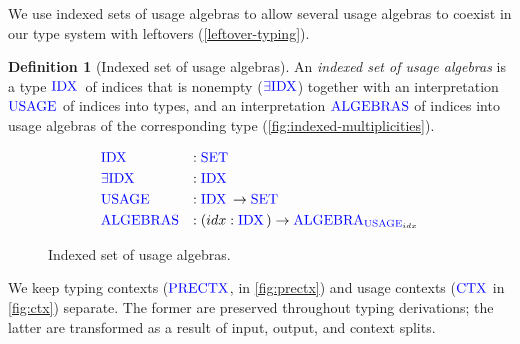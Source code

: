 \documentclass[sigplan,10pt,anonymous,review]{acmart}
\theoremstyle{definition}
\newtheorem{nidefinition}{Definition}
\newcommand{\type}[1]{\textcolor{blue}{\operatorname{#1}}}
\newcommand{\Set}{\type{SET}}
\newcommand{\PreCtx}{\type{PRECTX}}
\newcommand{\Ctx}{\type{CTX}}
\newcommand{\Idx}{\type{IDX}\,}
\newcommand{\Usage}{\type{USAGE}}
\newcommand{\Algebra}{\type{ALGEBRA}}
\begin{document}
We use indexed sets of usage algebras to allow several usage algebras to coexist in our type system with leftovers (\autoref{leftover-typing}).
\begin{nidefinition}[Indexed set of usage algebras]
  An \emph{indexed set of usage algebras} is a type $\Idx$ of indices that is nonempty ($\type{\exists IDX}$) together with an interpretation $\Usage$ of indices into types, and an interpretation $\type{ALGEBRAS}$ of indices into usage algebras of the corresponding type (\autoref{fig:indexed-multiplicities}).
  \begin{figure}[h]
    \begin{equation*}
      \begin{aligned}
        &\Idx               &:{} &\Set \\
        &\type{\exists IDX} &:{} &\Idx \\
        &\Usage             &:{} &\Idx \to \Set \\
        &\type{ALGEBRAS}    &:{} &(idx : \Idx) \to \Algebra_{\Usage_{idx}}
      \end{aligned}
    \end{equation*}
    \caption{Indexed set of usage algebras.}
    \label{fig:indexed-multiplicities}
  \end{figure}
\end{nidefinition}

We keep typing contexts ($\PreCtx$, in \autoref{fig:prectx}) and usage contexts ($\Ctx$ in \autoref{fig:ctx}) separate.
The former are preserved throughout typing derivations; the latter are transformed as a result of input, output, and context splits.
\end{document}
